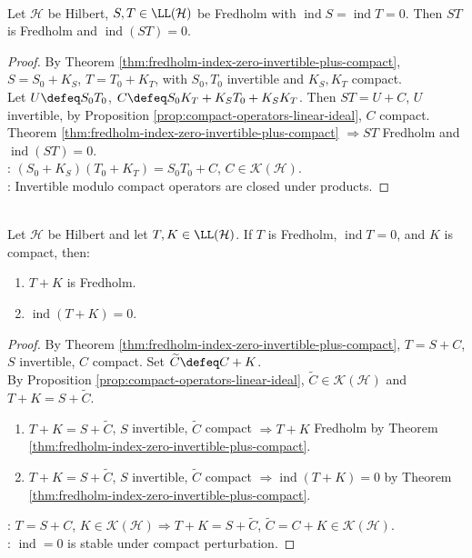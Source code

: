 \begin{corollary} \label{cor:fredholm-index-zero-closed-under-composition} \\
Let $\mathcal{H}$ be Hilbert, $S,T\in\LL(\mathcal{H})$ be Fredholm with $\operatorname{ind}S=\operatorname{ind}T=0$. Then $ST$ is Fredholm and $\operatorname{ind}(ST)=0$.
\begin{proof} By Theorem \ref{thm:fredholm-index-zero-invertible-plus-compact}, $S=S_0+K_S$, $T=T_0+K_T$, with $S_0,T_0$ invertible and $K_S,K_T$ compact.\\
Let $U\defeq S_0T_0$, $C\defeq S_0K_T+K_ST_0+K_SK_T$. Then $ST=U+C$, $U$ invertible, by Proposition \ref{prop:compact-operators-linear-ideal}, $C$ compact.\\
Theorem \ref{thm:fredholm-index-zero-invertible-plus-compact} $\Rightarrow ST$ Fredholm and $\operatorname{ind}(ST)=0$.\\
: $(S_0+K_S)(T_0+K_T)=S_0T_0+C$, $C\in\mathcal{K}(\mathcal{H})$.\\
: Invertible modulo compact operators are closed under products.
\end{proof}
\end{corollary}

\begin{corollary} \label{cor:fredholm-index-zero-stable-compact-perturbations} \\
Let $\mathcal{H}$ be Hilbert and let $T,K\in\LL(\mathcal{H})$. If $T$ is Fredholm, $\operatorname{ind}T=0$, and $K$ is compact, then:
\begin{enumerate}[label=(\roman*)]
\setlength{\itemsep}{0pt}
\item $T+K$ is Fredholm.
\item $\operatorname{ind}(T+K)=0$.
\end{enumerate}
\begin{proof}
By Theorem \ref{thm:fredholm-index-zero-invertible-plus-compact}, $T=S+C$, $S$ invertible, $C$ compact. Set $\widetilde C\defeq C+K$.\\
By Proposition \ref{prop:compact-operators-linear-ideal}, $\widetilde C\in\mathcal{K}(\mathcal{H})$ and $T+K=S+\widetilde C$.
\begin{enumerate}[label=(\roman*)]
\setlength{\itemsep}{0pt}
\item $T+K=S+\widetilde C$, $S$ invertible, $\widetilde C$ compact $\Rightarrow T+K$ Fredholm by Theorem \ref{thm:fredholm-index-zero-invertible-plus-compact}.
\item $T+K=S+\widetilde C$, $S$ invertible, $\widetilde C$ compact $\Rightarrow\operatorname{ind}(T+K)=0$ by Theorem \ref{thm:fredholm-index-zero-invertible-plus-compact}.
\end{enumerate}
: $T=S+C$, $K\in\mathcal{K}(\mathcal{H})\Rightarrow T+K=S+\widetilde C$, $\widetilde C=C+K\in\mathcal{K}(\mathcal{H})$.\\
: $\operatorname{ind}=0$ is stable under compact perturbation.
\end{proof}
\end{corollary}

